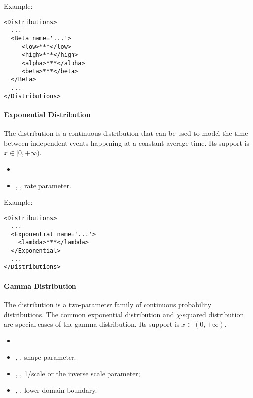 Example:
\begin{lstlisting}[style=XML]
<Distributions>
  ...
  <Beta name='...'>
     <low>***</low>
     <high>***</high>
     <alpha>***</alpha>
     <beta>***</beta>
  </Beta>
  ...
</Distributions>
\end{lstlisting}

\paragraph{Exponential Distribution}
\label{Exponential}
The  distribution is a continuous distribution that can be
used to model the time between independent events happening at a constant
average time.
%
Its support is $x \in [0, +\infty)$.

%
\attrIntro
\vspace{-5mm}
\begin{itemize}
\itemsep0em
\item \nameDescription
\end{itemize}
\vspace{-5mm}
\subnodeIntro
\begin{itemize}
\item {}, , rate parameter.
\end{itemize}

Example:
\begin{lstlisting}[style=XML]
<Distributions>
  ...
  <Exponential name='...'>
    <lambda>***</lambda>
  </Exponential>
  ...
</Distributions>
\end{lstlisting}

\paragraph{Gamma Distribution}
\label{Gamma}
The  distribution is a two-parameter family of continuous
probability distributions.
%
The common exponential distribution and $\chi$-squared distribution are special
cases of the gamma distribution.
%
Its support is $x \in (0,+\infty)$.

%
\attrIntro
\vspace{-5mm}
\begin{itemize}
\itemsep0em
\item \nameDescription
\end{itemize}
\vspace{-5mm}
\subnodesIntro
\begin{itemize}
\item {}, , shape parameter.
\item {}, , 1/scale or the
  inverse scale parameter;
\item {}, ,  lower domain
boundary.
\end{itemize}

